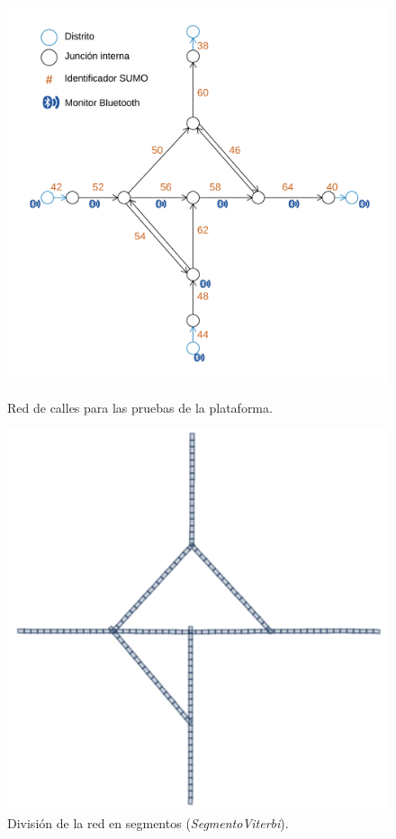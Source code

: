 \begin{figure}[!htp]
\begin{minipage}{.49\textwidth}
	\centering
	\includegraphics[width=0.9\linewidth]{images/result-network.png}
	\captionsetup{width=0.8\linewidth}
	\caption{Red de calles para las pruebas de la plataforma.}
    \label{fig:result-network}
\end{minipage}
\begin{minipage}{.49\textwidth}
	\centering
	\includegraphics[width=0.9\linewidth]{images/result-segmentos.png}
	\captionsetup{width=0.8\linewidth}
	\caption{División de la red en segmentos (\textit{SegmentoViterbi}).}
    \label{fig:result-segments}
\end{minipage}
\end{figure}

